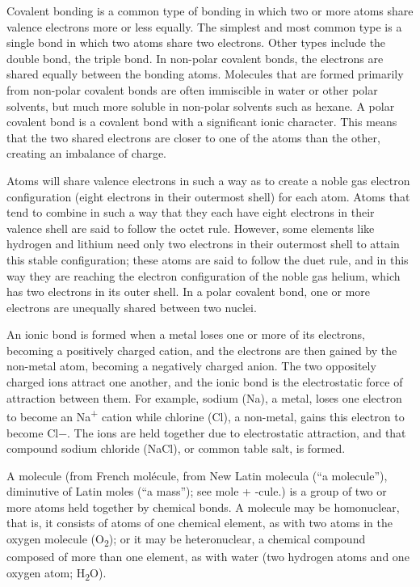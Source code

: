 Covalent bonding is a common type of bonding in which two or more atoms
share valence electrons more or less equally. The simplest and most
common type is a single bond in which two atoms share two electrons.
Other types include the double bond, the triple bond. In non-polar
covalent bonds, the electrons are shared equally between the bonding
atoms. Molecules that are formed primarily from non-polar covalent bonds
are often immiscible in water or other polar solvents, but much more
soluble in non-polar solvents such as hexane. A polar covalent bond is a
covalent bond with a significant ionic character. This means that the
two shared electrons are closer to one of the atoms than the other,
creating an imbalance of charge.

Atoms will share valence electrons in such a way as to create a noble
gas electron configuration (eight electrons in their outermost shell)
for each atom. Atoms that tend to combine in such a way that they each
have eight electrons in their valence shell are said to follow the octet
rule. However, some elements like hydrogen and lithium need only two
electrons in their outermost shell to attain this stable configuration;
these atoms are said to follow the duet rule, and in this way they are
reaching the electron configuration of the noble gas helium, which has
two electrons in its outer shell. In a polar covalent bond, one or more
electrons are unequally shared between two nuclei.

An ionic bond is formed when a metal loses one or more of its electrons,
becoming a positively charged cation, and the electrons are then gained
by the non-metal atom, becoming a negatively charged anion. The two
oppositely charged ions attract one another, and the ionic bond is the
electrostatic force of attraction between them. For example, sodium
(Na), a metal, loses one electron to become an Na\textsuperscript{+}
cation while chlorine (Cl), a non-metal, gains this electron to become
Cl−. The ions are held together due to electrostatic attraction, and
that compound sodium chloride (NaCl), or common table salt, is formed.

A molecule (from French molécule, from New Latin molecula (``a
molecule''), diminutive of Latin moles (``a mass''); see mole + -cule.)
is a group of two or more atoms held together by chemical bonds. A
molecule may be homonuclear, that is, it consists of atoms of one
chemical element, as with two atoms in the oxygen molecule
(O\textsubscript{2}); or it may be heteronuclear, a chemical compound
composed of more than one element, as with water (two hydrogen atoms and
one oxygen atom; H\textsubscript{2}O).

